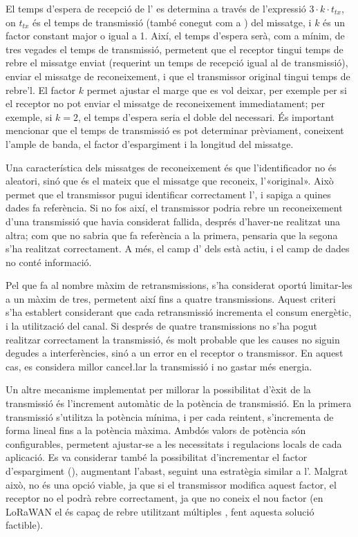\documentclass{tfgitic}[2024/07/01]
\begin{document}
El temps d'espera de recepció de l' es determina a través de l'expressió $3 \cdot k \cdot t_{tx}$, on $t_{tx}$ és el temps de transmissió (també conegut com a ) del missatge, i $k$ és un factor constant major o igual a 1. Així, el temps d'espera serà, com a mínim, de tres vegades el temps de transmissió, permetent que el receptor tingui temps de rebre el missatge enviat (requerint un temps de recepció igual al de transmissió), enviar el missatge de reconeixement, i que el transmissor original tingui temps de rebre'l. El factor ${k}$ permet ajustar el marge que es vol deixar, per exemple per si el receptor no pot enviar el missatge de reconeixement immediatament; per exemple, si $k=2$, el temps d'espera seria el doble del necessari. És important mencionar que el temps de transmissió es pot determinar prèviament, coneixent l'ample de banda, el factor d'espargiment i la longitud del missatge.

Una característica dels missatges de reconeixement és que l'identificador no és aleatori, sinó que és el mateix que el missatge que reconeix, l'«original». Això permet que el transmissor pugui identificar correctament l', i sapiga a quines dades fa referència. Si no fos així, el transmissor podria rebre un reconeixement d'una transmissió que havia considerat fallida, després d'haver-ne realitzat una altra; com que no sabria que fa referència a la primera, pensaria que la segona s'ha realitzat correctament. A més, el camp d' dels  està actiu, i el camp de dades no conté informació.

Pel que fa al nombre màxim de retransmissions, s'ha considerat oportú limitar-les a un màxim de tres, permetent així fins a quatre transmissions. Aquest criteri s'ha establert considerant que cada retransmissió incrementa el consum energètic, i la utilització del canal. Si després de quatre transmissions no s'ha pogut realitzar correctament la transmissió, és molt probable que les causes no siguin degudes a interferències, sinó a un error en el receptor o transmissor. En aquest cas, es considera millor cance\l.lar la transmissió i no gastar més energia.

Un altre mecanisme implementat per millorar la possibilitat d'èxit de la transmissió és l'increment automàtic de la potència de transmissió. En la primera transmissió s'utilitza la potència mínima, i per cada reintent, s'incrementa de forma lineal fins a la potència màxima. Ambdós valors de potència són configurables, permetent ajustar-se a les necessitats i regulacions locals de cada aplicació. Es va considerar també la possibilitat d'incrementar el factor d'espargiment (), augmentant l'abast, seguint una estratègia similar a l'. Malgrat això, no és una opció viable, ja que si el transmissor modifica aquest factor, el receptor no el podrà rebre correctament, ja que no coneix el nou factor (en LoRaWAN el  és capaç de rebre utilitzant múltiples , fent aquesta solució factible). 
\end{document}
